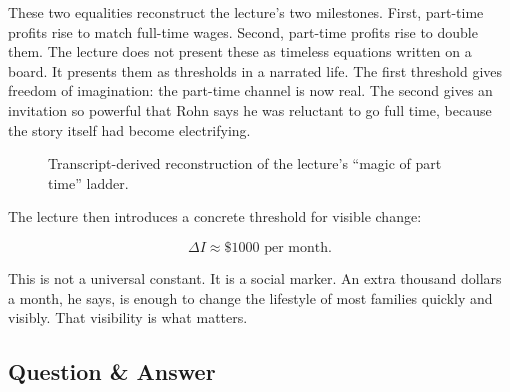 These two equalities reconstruct the lecture's two milestones. First, part-time profits rise to match full-time wages. Second, part-time profits rise to double them. The lecture does not present these as timeless equations written on a board. It presents them as thresholds in a narrated life. The first threshold gives freedom of imagination: the part-time channel is now real. The second gives an invitation so powerful that Rohn says he was reluctant to go full time, because the story itself had become electrifying.

\begin{figure}[h]
\centering
{}
\caption{Transcript-derived reconstruction of the lecture's ``magic of part time'' ladder.}
\end{figure}

The lecture then introduces a concrete threshold for visible change:

\begin{equation}
\Delta I \approx \$1000 \text{ per month.}
\end{equation}

This is not a universal constant. It is a social marker. An extra thousand dollars a month, he says, is enough to change the lifestyle of most families quickly and visibly. That visibility is what matters.

\subsection{Question \& Answer}

